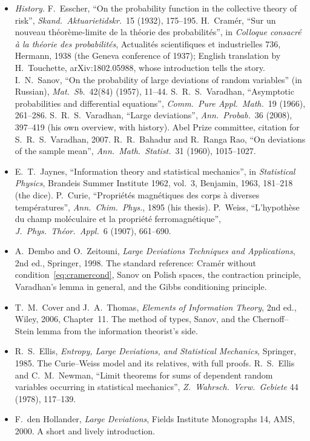 \begin{itemize}
\item \emph{History.} F.~Esscher, ``On the probability function in the collective theory of risk'', \emph{Skand.\ Aktuarietidskr.}\ 15 (1932), 175--195. H.~Cram\'er, ``Sur un nouveau
th\'eor\`eme-limite de la th\'eorie des probabilit\'es'', in \emph{Colloque consacr\'e \`a la th\'eorie des probabilit\'es}, Actualit\'es scientifiques et industrielles 736, Hermann, 1938
(the Geneva conference of 1937); English translation by H.~Touchette, arXiv:1802.05988, whose introduction tells the story. I.~N.~Sanov, ``On the probability of large
deviations of random variables'' (in Russian), \emph{Mat.\ Sb.}\ 42(84) (1957), 11--44. S.~R.~S.~Varadhan, ``Asymptotic probabilities and differential equations'', \emph{Comm.\ Pure
Appl.\ Math.}\ 19 (1966), 261--286. S.~R.~S.~Varadhan, ``Large deviations'', \emph{Ann.\ Probab.}\ 36 (2008), 397--419 (his own overview, with history). Abel Prize committee, citation for
S.~R.~S.~Varadhan, 2007. R.~R.~Bahadur and R.~Ranga Rao, ``On deviations of the sample mean'', \emph{Ann.\ Math.\ Statist.}\ 31 (1960), 1015--1027.
\item E.~T.~Jaynes, ``Information theory and statistical mechanics'', in \emph{Statistical Physics}, Brandeis Summer Institute 1962, vol.~3, Benjamin, 1963, 181--218 (the dice).
P.~Curie, ``Propri\'et\'es magn\'etiques des corps \`a diverses temp\'eratures'', \emph{Ann.\ Chim.\ Phys.}, 1895 (his thesis). P.~Weiss, ``L'hypoth\`ese du champ mol\'eculaire et la propri\'et\'e
ferromagn\'etique'', \emph{J.\ Phys.\ Th\'eor.\ Appl.}\ 6 (1907), 661--690.
\item A.~Dembo and O.~Zeitouni, \emph{Large Deviations Techniques and Applications}, 2nd ed., Springer, 1998. The standard reference: Cram\'er without condition~\eqref{eq:cramercond},
Sanov on Polish spaces, the contraction principle, Varadhan's lemma in general, and the Gibbs conditioning principle.
\item T.~M.~Cover and J.~A.~Thomas, \emph{Elements of Information Theory}, 2nd ed., Wiley, 2006, Chapter~11. The method of types, Sanov, and the Chernoff--Stein lemma
from the information theorist's side.
\item R.~S.~Ellis, \emph{Entropy, Large Deviations, and Statistical Mechanics}, Springer, 1985. The Curie--Weiss model and its relatives, with full proofs. R.~S.~Ellis and
C.~M.~Newman, ``Limit theorems for sums of dependent random variables occurring in statistical mechanics'', \emph{Z.\ Wahrsch.\ Verw.\ Gebiete} 44 (1978), 117--139.
\item F.~den Hollander, \emph{Large Deviations}, Fields Institute Monographs 14, AMS, 2000. A short and lively introduction.
\end{itemize}
